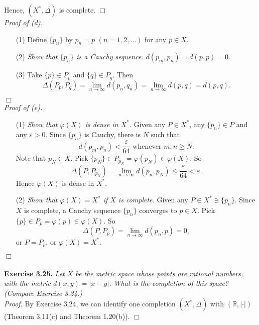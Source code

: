 \documentclass{article}
\begin{document}
Hence, $(X^*, \Delta)$ is complete.
$\Box$ \\



\emph{Proof of (d).}
\begin{enumerate}
\item[(1)]
Define $\{p_n\}$ by $p_n = p$ $(n = 1,2,\ldots)$ for any $p \in X$.
\item[(2)]
\emph{Show that $\{p_n\}$ is a Cauchy sequence.}
$d(p_m,p_n) = d(p,p) = 0$.
\item[(3)]
Take $\{p\} \in P_p$ and $\{q\} \in P_q$.
Then
$$\Delta(P_p,P_q)
= \lim_{n \to \infty} d(p_n,q_n)
= \lim_{n \to \infty} d(p,q)
= d(p,q).$$
\end{enumerate}
$\Box$ \\



\emph{Proof of (e).}
\begin{enumerate}
\item[(1)]
\emph{Show that $\varphi(X)$ is dense in $X^*$.}
Given any $P \in X^*$, any $\{p_n\} \in P$ and any $\varepsilon > 0$.
Since $\{p_n\}$ is Cauchy, there is $N$ such that
$$d(p_m,p_n) < \frac{\varepsilon}{64} \text{ whenever } m,n \geq N.$$
Note that $p_N \in X$.
Pick $\{p_N\} \in P_{p_N} = \varphi(p_N) \in \varphi(X)$.
So
$$\Delta(P,P_{p_N})
= \lim_{n \to \infty} d(p_n,p_N)
\leq \frac{\varepsilon}{64}
< \varepsilon.$$
Hence $\varphi(X)$ is dense in $X^*$.
\item[(2)]
\emph{Show that $\varphi(X) = X^*$ if $X$ is complete.}
Given any $P \in X^* \ni \{p_n\}$.
Since $X$ is complete, a Cauchy sequence $\{p_n\}$ converges to $p \in X$.
Pick $\{p\} \in P_p = \varphi(p) \in \varphi(X)$.
So
$$\Delta(P,P_p)
= \lim_{n \to \infty} d(p_n,p)
= 0,$$
or $P = P_p$, or $\varphi(X) = X^*$.
\end{enumerate}
$\Box$ \\\\






\textbf{Exercise 3.25.}
\emph{Let $X$ be the metric space whose points are rational numbers,
with the metric $d(x,y) = |x-y|$.
What is the completion of this space? (Compare Exercise 3.24.)} \\

\emph{Proof.}
By Exercise 3.24, we can identify one completion $(X^*,\Delta)$ with $(\mathbb{R},|\cdot|)$
(Theorem 3.11(c) and Theorem 1.20(b)).
$\Box$ \\
\end{document}
